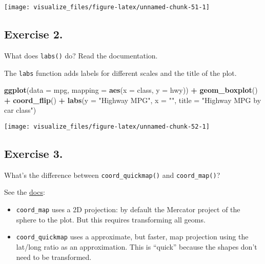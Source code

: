 \documentclass[]{book}
\newenvironment{Shaded}{\begin{snugshade}}{\end{snugshade}}
\newcommand{\DataTypeTok}[1]{\textcolor[rgb]{0.13,0.29,0.53}{#1}}
\newcommand{\KeywordTok}[1]{\textcolor[rgb]{0.13,0.29,0.53}{\textbf{#1}}}
\newcommand{\NormalTok}[1]{#1}
\newcommand{\OperatorTok}[1]{\textcolor[rgb]{0.81,0.36,0.00}{\textbf{#1}}}
\newcommand{\StringTok}[1]{\textcolor[rgb]{0.31,0.60,0.02}{#1}}
\providecommand{\tightlist}{%
  \setlength{\itemsep}{0pt}\setlength{\parskip}{0pt}}
\theoremstyle{definition}
\theoremstyle{definition}
\theoremstyle{definition}
\theoremstyle{remark}
\begin{document}
\begin{center}\texttt{[image: visualize\_files/figure-latex/unnamed-chunk-51-1]} \end{center}

\hypertarget{exercise-2.-6}{%
\subsection{Exercise 2.}\label{exercise-2.-6}}

What does \texttt{labs()} do? Read the documentation.

The \texttt{labs} function adds labels for different scales and the
title of the plot.

\begin{Shaded}
\begin{Highlighting}[]
\KeywordTok{ggplot}\NormalTok{(}\DataTypeTok{data =}\NormalTok{ mpg, }\DataTypeTok{mapping =} \KeywordTok{aes}\NormalTok{(}\DataTypeTok{x =}\NormalTok{ class, }\DataTypeTok{y =}\NormalTok{ hwy)) }\OperatorTok{+}\StringTok{ }
\StringTok{  }\KeywordTok{geom_boxplot}\NormalTok{() }\OperatorTok{+}
\StringTok{  }\KeywordTok{coord_flip}\NormalTok{() }\OperatorTok{+}
\StringTok{  }\KeywordTok{labs}\NormalTok{(}\DataTypeTok{y =} \StringTok{"Highway MPG"}\NormalTok{, }\DataTypeTok{x =} \StringTok{""}\NormalTok{, }\DataTypeTok{title =} \StringTok{"Highway MPG by car class"}\NormalTok{)}
\end{Highlighting}
\end{Shaded}

\begin{center}\texttt{[image: visualize\_files/figure-latex/unnamed-chunk-52-1]} \end{center}

\hypertarget{exercise-3.-6}{%
\subsection{Exercise 3.}\label{exercise-3.-6}}

What's the difference between \texttt{coord\_quickmap()} and
\texttt{coord\_map()}?

See the
\href{http://docs.ggplot2.org/current/coord_quickmap.html}{docs}:

\begin{itemize}
\tightlist
\item
  \texttt{coord\_map} uses a 2D projection: by default the Mercator
  project of the sphere to the plot. But this requires transforming all
  geoms.
\item
  \texttt{coord\_quickmap} uses a approximate, but faster, map
  projection using the lat/long ratio as an approximation. This is
  ``quick'' because the shapes don't need to be transformed.
\end{itemize}
\end{document}

